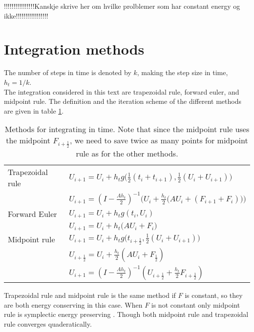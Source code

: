 !!!!!!!!!!!!!!!!Kanskje skrive her om hvilke prolblemer som har constant energy og ikke!!!!!!!!!!!!!!!!!\\

\section{Integration methods}%
The number of steps in time is denoted by $k$, making the step size in time, $h_t = 1/k$.\\
The integration considered in this text are trapezoidal rule, forward euler, and midpoint rule. The definition and the iteration scheme of the different methods are given in table \ref{tab:intmet}. 

\begin{table}
\begin{tabular}{l l}
	Trapezoidal rule \cite{trapezoidal} & $U_{i+1} = U_{i}+h_t g \Big( \frac{1}{2}(t_i+t_{i+1}),\frac{1}{2}(U_i+U_{i+1}) \Big)$
	\\ & $U_{i+1} = (I- \frac{A h_t}{2}) ^{-1} \Big(  U_i + \frac{h_t}{2} \big( A U_i+(F_{i+1}+F_i) \big)  \Big) $\\
\hline	
	Forward Euler \cite{forwardeuler} & $ U_{i+1} = U_i + h_t g ( t_i, U_i ) $ \\ & $ U_{i+1} = U_i + h_t \big( A U_i + F_i \big) $ \\
	\hline
	Midpoint rule \cite{midpoint} & $U_{i+1} = U_i + h_t g \Big(  t_{i+\frac{1}{2}} , \frac{1}{2}(U_i + U_{i+1})    \Big) $ \\ & 
	$U_{i+\frac{1}{2}} = U_i + \frac{h_t}{2} ( A U_i + F_{\frac{1}{2}} )$ \\ &
    $U_{i+1} = (I-\frac{A h_t}{2}) ^{-1} (U_{i+\frac{1}{2}} + \frac{h_t}{2} F_{i+ \frac{1}{2}})$
    
    
\end{tabular}

\caption{Methods for integrating in time. Note that since the midpoint rule uses the midpoint $F_{i+\frac{1}{2}}$, we need to save twice as many points for midpoint rule as for the other methods.} 
\label{tab:intmet}
\end{table}
Trapezoidal rule and midpoint rule is the same method if $F$ is constant, so they are both energy conserving in this case. When $F$ is not constant only midpoint rule is symplectic energy preserving \cite{!!!!!!!!!}. Though both midpoint rule and trapezoidal rule converges quaderatically.

